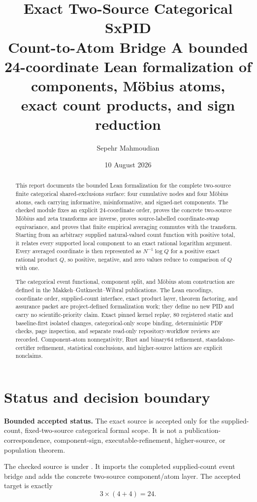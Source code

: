\documentclass[11pt]{article}
\title{\PidReportTitle
  {Exact Two-Source Categorical SxPID\\Count-to-Atom Bridge}
  {A bounded 24-coordinate Lean formalization of components, M\"obius atoms,\\
   exact count products, and sign reduction}}
\author{Sepehr Mahmoudian}
\date{10 August 2026}
\theoremstyle{definition}
\begin{document}
\PidMakeTitle

\begin{abstract}
This report documents the bounded Lean formalization for the complete two-source finite
categorical shared-exclusions surface: four cumulative nodes and four M\"obius atoms, each carrying
informative, misinformative, and signed-net components.  The checked module fixes an explicit
24-coordinate order, proves the concrete two-source M\"obius and zeta transforms are inverse,
proves source-labelled coordinate-swap equivariance, and proves that finite empirical averaging commutes with the
transform.  Starting from an arbitrary supplied natural-valued count function with positive total,
it relates every supported local component to an exact rational logarithm argument.  Every averaged
coordinate is then represented as \(N^{-1}\log Q\) for a positive exact rational product \(Q\), so
positive, negative, and zero values reduce to comparison of \(Q\) with one.

The categorical event functional, component split, and M\"obius atom construction are defined in
the Makkeh--Gutknecht--Wibral publications.  The Lean encodings, coordinate order, supplied-count
interface, exact product layer, theorem factoring, and assurance packet are project-defined
formalization work; they define no new PID and carry no scientific-priority claim.  Exact pinned
kernel replay, 80 registered static and baseline-first isolated changes, categorical-only scope
binding, deterministic PDF checks, page inspection, and separate read-only repository-workflow
reviews are recorded.  Component-atom nonnegativity, Rust and binary64 refinement,
standalone-certifier refinement, statistical conclusions, and higher-source lattices are explicit
nonclaims.
\end{abstract}

\tableofcontents

\section{Status and decision boundary}

\noindent\colorbox{PidSoft}{%
  \parbox{\dimexpr\linewidth-2\fboxsep\relax}{%
    \textbf{Bounded accepted status.}  The exact source is accepted only for the supplied-count,
    fixed-two-source categorical formal scope.  It is not a publication-correspondence,
    component-sign, executable-refinement, higher-source, or population theorem.}}

The checked source is  under
.  It imports the completed supplied-count event bridge
and adds the concrete two-source component/atom layer.  The accepted target is exactly
\begin{equation}\label{eq:coordinate-count}
3\times(4+4)=24.
\end{equation}
\end{document}
